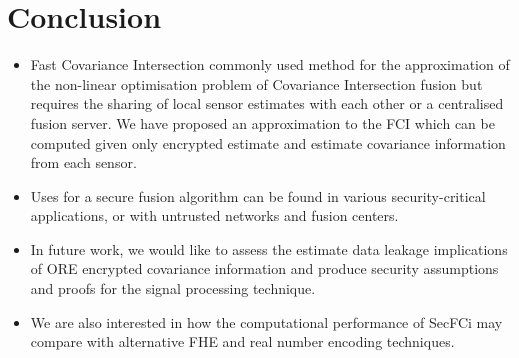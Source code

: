 \documentclass[letterpaper, 10 pt, conference]{ieeeconf}  %
\begin{document}
\section{Conclusion} \label{sec:conclusion}
\begin{itemize}
   \item Fast Covariance Intersection commonly used method for the approximation of the non-linear optimisation problem of Covariance Intersection fusion but requires the sharing of local sensor estimates with each other or a centralised fusion server. We have proposed an approximation to the FCI which can be computed given only encrypted estimate and estimate covariance information from each sensor.
   \item Uses for a secure fusion algorithm can be found in various security-critical applications, or with untrusted networks and fusion centers.
   \item In future work, we would like to assess the estimate data leakage implications of ORE encrypted covariance information and produce security assumptions and proofs for the signal processing technique.
   \item We are also interested in how the computational performance of SecFCi may compare with alternative FHE and real number encoding techniques.
\end{itemize}





\end{document}
